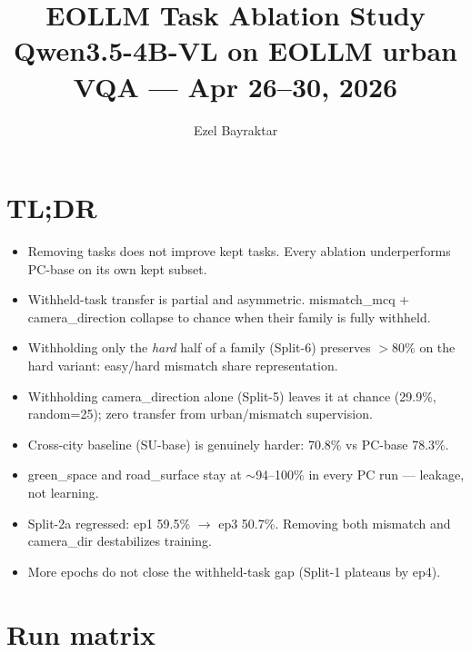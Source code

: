 \documentclass[11pt]{article}
\title{\textbf{EOLLM Task Ablation Study}\\[2pt]
\large Qwen3.5-4B-VL on EOLLM urban VQA --- Apr 26--30, 2026}
\author{Ezel Bayraktar}
\date{}
\begin{document}
\maketitle
\vspace{-1.2cm}

\section*{TL;DR}
\begin{itemize}\itemsep1pt
\item Removing tasks does not improve kept tasks. Every ablation underperforms PC-base on its own kept subset.
\item Withheld-task transfer is partial and asymmetric. mismatch\_mcq + camera\_direction collapse to chance when their family is fully withheld.
\item Withholding only the \emph{hard} half of a family (Split-6) preserves $>$80\% on the hard variant: easy/hard mismatch share representation.
\item Withholding camera\_direction alone (Split-5) leaves it at chance (29.9\%, random=25); zero transfer from urban/mismatch supervision.
\item Cross-city baseline (SU-base) is genuinely harder: 70.8\% vs PC-base 78.3\%.
\item green\_space and road\_surface stay at $\sim$94--100\% in every PC run --- leakage, not learning.
\item Split-2a regressed: ep1 59.5\% $\to$ ep3 50.7\%. Removing both mismatch and camera\_dir destabilizes training.
\item More epochs do not close the withheld-task gap (Split-1 plateaus by ep4).
\end{itemize}

\section{Run matrix}
\end{document}
